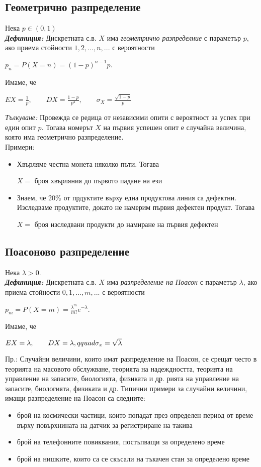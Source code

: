 \documentclass[11pt]{article} %
\newcommand{\italicBold}[1]{\textbf{\emph{#1}}}
\newcommand{\definition}{\italicBold{Дефиниция: }}
\begin{document}
\subsection{Геометрично разпределение}
Нека $p \in (0,1)$\\
\definition Дискретната с.в. $X$ има \textit{геометрично разпределние} с параметър $p$, ако приема стойности $1,2,...,n,...$ с вероятности\\
\centerline{$p_{n}=P(X=n)=(1-p)^{n-1}p$.}
Имаме, че\\
\centerline{$EX=\frac{1}{p}, \qquad DX = \frac{1-p}{p^{2}}, \qquad \sigma_{X}=\frac{\sqrt{1-p}}{p}$}
\textit{Тълкуване:} Провежда се редица от независими опити с вероятност за успех при един опит $p$. Тогава номерът $X$ на първия успешен опит е случайна величина, която има геометрично разпределение.\\
Примери:
\begin{itemize}
	\item Хвърляме честна монета няколко пъти. Тогава \\
		\centerline{$X=$ броя хвърляния до първото падане на ези}
	\item Знаем, че 20\% от прдуктите върху една продуктова линия са дефектни. Изследваме продуктите, докато не намерим първия дефектен продукт. Тогава \\
		\centerline{$X=$ броя изследвани продукти до намиране на първия дефектен}
\end{itemize}

\subsection{Поасоново разпределение}
Нека $\lambda > 0$.\\
\definition Дискретната с.в. $X$ има \textit{разпределение на Поасон} с параметър $\lambda$, ако приема стойности $0,1,...,m,...$ с вероятности\\
\centerline{$p_{m}=P(X=m)=\frac{\lambda^{m}}{m!}e^{-\lambda}$.}
Имаме, че\\
\centerline{$EX=\lambda, \qquad DX=\lambda, \\qquad \sigma_{x}=\sqrt{\lambda}$}
Пр.: Случайни величини, които имат разпределение на Поасон, се срещат често в теорията на масовото обслужване, теорията на надеждността, теорията на управление на запасите, биологията, физиката и др.
рията на управление на запасите, биологията, физиката и др.
Типични примери за случайни величини, имащи разпределение на
Поасон са следните:
\begin{itemize}
	\item брой на космически частици, които попадат през определен период от време върху повърхнината на датчик за регистриране на такива\\
	\item брой на телефонните повиквания, постъпващи за определено време\\
	\item брой на нишките, които са се скъсали на тъкачен стан за определено време
\end{itemize}
\end{document}
